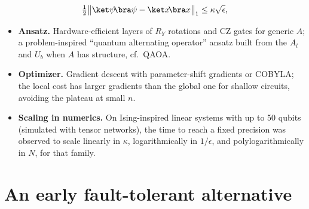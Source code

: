 \documentclass[handoutsbeamer.tex]{subfiles}
\begin{document}
\begin{frame}
\begin{equation}
    \tfrac12\big\|\ket\psi\!\bra\psi - \ket x\!\bra x\big\|_1 \le \kappa\sqrt{\epsilon},
\end{equation}
\begin{itemize}\setlength\itemsep{0.2em}
    \item \textbf{Ansatz.} Hardware-efficient layers of $R_Y$ rotations and CZ gates for generic $A$; a problem-inspired ``quantum alternating operator'' ansatz built from the $A_l$ and $U_b$ when $A$ has structure, cf.\ QAOA.
    \item \textbf{Optimizer.} Gradient descent with parameter-shift gradients or COBYLA; the local cost has larger gradients than the global one for shallow circuits, avoiding the plateau at small $n$.
    \item \textbf{Scaling in numerics.} On Ising-inspired linear systems with up to 50 qubits (simulated with tensor networks), the time to reach a fixed precision was observed to scale linearly in $\kappa$, logarithmically in $1/\epsilon$, and polylogarithmically in $N$, for that family.
\end{itemize}
\end{frame}

\section{An early fault-tolerant alternative}
\end{document}
